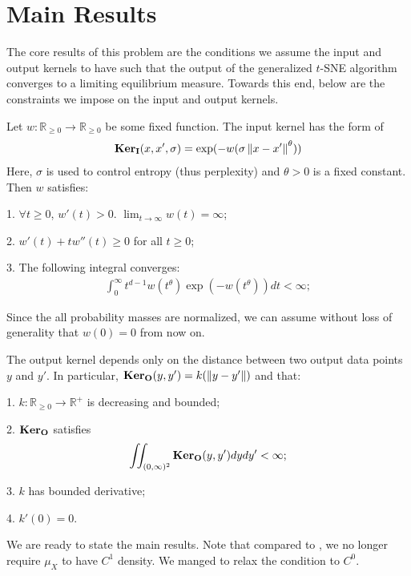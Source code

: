 \section{Main Results} \label{tsne:sec:main_results}
The core results of this problem are the conditions we assume the input and
output kernels to have such that the output of the generalized $t$-SNE
algorithm converges to a limiting equilibrium measure. Towards this end, below
are the constraints we impose on the input and output kernels.
\begin{condition} \label{input_kernel_conditions}
    Let $w: \mathbb{R}_{\geq 0} \to \mathbb{R}_{\geq 0}$ be some fixed function. The input kernel has the form of
    \begin{align} \label{tsne:input_kernel}
        \mathbf{Ker}_{\mathbf{I}}(x,x',\sigma) = \exp(-w(\sigma\left\lVert x-x'\right\rVert^{\theta}))
    \end{align}
    Here, $\sigma$ is used to control entropy (thus perplexity) and $\theta>0$ is a fixed constant. Then $w$ satisfies:

    1. $\forall t \geq 0$, $w'(t)>0$. $\lim_{t \to \infty} w(t) = \infty$;

    2. $w'(t)+tw''(t) \geq 0$ for all $t \geq 0$;

    3. The following integral converges:
    \begin{align}
        \int_0^{\infty} t^{d-1} w(t^{\theta}) \exp(-w(t^{\theta}))dt < \infty;
    \end{align}
\end{condition}
Since the all probability masses are normalized, we can assume without loss of generality that $w(0)=0$ from now on.
\begin{condition} \label{output_kernel_conditions}
    The output kernel depends only on the distance between two output data points $y$ and $y'$. In particular, $\mathbf{Ker}_{\mathbf{O}}(y,y') = k (\left\lVert y-y'\right\rVert)$ and that:

    1. $k: \mathbb{R}_{\geq 0} \to \mathbb{R}^+$ is decreasing and bounded;

    2. $\mathbf{Ker}_{\mathbf{O}}$ satisfies
    \begin{align}
        \iint_{(0,\infty)^2} \mathbf{Ker}_{\mathbf{O}}(y,y') dy dy' < \infty;
    \end{align}

    3. $k$ has bounded derivative;

    4. $k'(0) = 0$.
\end{condition}
We are ready to state the main results. Note that compared to \cite{auffinger-tsne}, we no longer require $\mu_X$ to have $C^1$ density. We manged to relax the condition to $C^0$.
